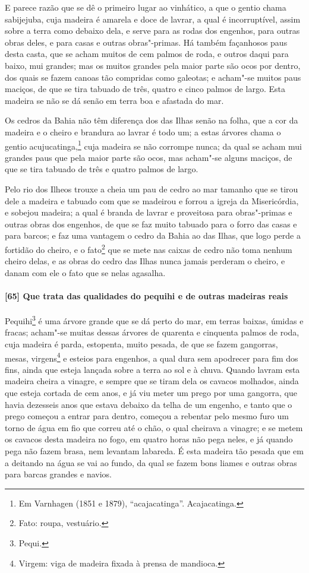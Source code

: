 \begin{linenumbers}
E parece razão que se dê o primeiro lugar ao vinhático, a que o gentio chama sabijejuba,
cuja madeira é amarela e doce de lavrar, a qual é incorruptível, assim sobre a terra como
debaixo dela, e serve para as rodas dos engenhos, para outras obras deles, e para casas e
outras obras"-primas. Há também façanhosos paus desta casta, que se acham muitos de cem
palmos de roda, e outros daqui para baixo, mui grandes; mas os muitos grandes pela maior
parte são ocos por dentro, dos quais se fazem canoas tão compridas
como galeotas; e acham"-se muitos paus maciços, de que se tira tabuado de três, quatro e
cinco palmos de largo. Esta madeira se não se dá senão em terra boa e afastada do mar.


Os cedros da Bahia não têm diferença dos das Ilhas senão na folha, que a cor da madeira e
o cheiro e brandura ao lavrar é todo um; a estas árvores chama o gentio
acujucatinga,\footnote{ Em Varnhagen (1851 e 1879), ``acajacatinga''. Acajacatinga.} cuja
madeira se não corrompe nunca; da qual se acham mui grandes paus que pela maior parte são
ocos, mas acham"-se alguns maciços, de que se tira tabuado de três e quatro palmos de
largo.

Pelo rio dos Ilheos trouxe a cheia um pau de cedro ao mar tamanho que se tirou dele a
madeira e tabuado com que se madeirou e forrou a igreja da Misericórdia, e sobejou
madeira; a qual é branda de lavrar e proveitosa para obras"-primas e outras obras dos
engenhos, de que se faz muito tabuado para o forro das casas e para barcos; e faz uma
vantagem o cedro da Bahia ao das Ilhas, que logo perde a fortidão do cheiro, e o
fato\footnote{ Fato: roupa, vestuário.} que se mete nas caixas de cedro não toma nenhum
cheiro delas, e as obras do cedro das Ilhas nunca jamais perderam o cheiro, e
danam com ele o fato que se nelas agasalha.

\paragraph{[65] Que trata das qualidades do pequihi e de outras madeiras reais}\quad
Pequihi\footnote{ Pequi.} é uma árvore grande que se dá perto do mar, em terras baixas,
úmidas e fracas; acham"-se muitas dessas árvores de quarenta e cinquenta palmos de roda,
cuja madeira é parda, estopenta, muito pesada, de que se fazem gangorras, mesas,
virgens\footnote{ Virgem: viga de madeira fixada à prensa de mandioca.} e esteios para
engenhos, a qual dura sem apodrecer para fim dos fins, ainda que esteja lançada sobre a
terra ao sol e à chuva. Quando lavram esta madeira cheira a vinagre, e sempre que se tiram
dela os cavacos molhados, ainda que esteja cortada de cem anos, e já viu meter um prego
por uma gangorra, que havia dezesseis anos que estava debaixo da telha de um engenho, e
tanto que o prego começou a entrar para dentro, começou a rebentar pelo mesmo furo um
torno de água em fio que correu até o chão, o qual cheirava a vinagre; e se metem os
cavacos desta madeira no fogo, em quatro horas não pega neles, e já quando pega não fazem
brasa, nem levantam labareda. É esta madeira tão pesada que em a deitando na água se vai
ao fundo, da qual se fazem bons liames e outras obras para barcas grandes e navios.


\end{linenumbers}
